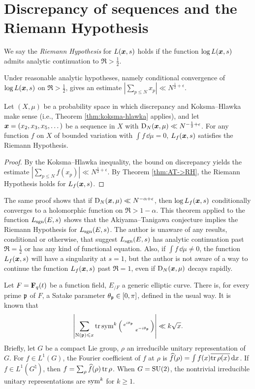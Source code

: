 \section{Discrepancy of sequences and the Riemann Hypothesis}

\begin{definition}
We say the \emph{Riemann Hypothesis} for $L({\boldsymbol x},s)$ holds if the function 
$\log L({\boldsymbol x},s)$ admits analytic continuation to $\Re > \frac 1 2$. 
\end{definition}

Under reasonable analytic hypotheses, namely conditional convergence of 
$\log L({\boldsymbol x},s)$ on $\Re > \frac 1 2$, \cite[II.1 Th.~10]{tenenbaum-1995} gives 
an estimate $|\sum_{p\leqslant N} x_p| \ll N^{\frac 1 2 + \epsilon}$. 

\begin{theorem}
Let $(X,\mu)$ be a probability space in which discrepancy and Koksma--Hlawka 
make sense (i.e., Theorem \ref{thm:koksma-hlawka} applies), and let 
${\boldsymbol x}=(x_2,x_3,x_5,\dots)$ be a sequence in $X$ with 
$\operatorname{D}_N({\boldsymbol x},\mu) \ll N^{-\frac 1 2+\epsilon}$. For any function $f$ on $X$ of 
bounded variation with $\int f\, \dd\mu = 0$, $L_f({\boldsymbol x},s)$ satisfies 
the Riemann Hypothesis. 
\end{theorem}
\begin{proof}
By the Koksma--Hlawka inequality, the bound on discrepancy yields the estimate 
$\left| \sum_{p\leqslant N} f(x_p)\right| \ll N^{\frac 1 2+\epsilon}$. 
By Theorem \ref{thm:AT->RH}, the Riemann Hypothesis holds for $L_f({\boldsymbol x},s)$. 
\end{proof}

The same proof shows that if $\operatorname{D}_N({\boldsymbol x},\mu)\ll N^{-\alpha+\epsilon}$, then 
$\log L_f({\boldsymbol x},s)$ conditionally converges to a holomorphic function on 
$\Re > 1 - \alpha$. This theorem applied to the function $L_{\operatorname{sgn}}(E,s)$ shows 
that the Akiyama--Tanigawa conjecture implies the Riemann Hypothesis for 
$L_{\operatorname{sgn}}(E,s)$. The author is unaware of any results, conditional or 
otherwise, that suggest $L_{\operatorname{sgn}}(E,s)$ has analytic continuation past 
$\Re = \frac 1 2$ or has any kind of functional equation. Also, if 
$\int f\, \dd\mu \ne 0$, the function $L_f({\boldsymbol x},s)$ will have a singularity at 
$s = 1$, but the author is not aware of a way to continue the function 
$L_f({\boldsymbol x},s)$ past $\Re = 1$, even if $\operatorname{D}_N({\boldsymbol x},\mu)$ decays rapidly. 

Let $F = \mathbf{F}_q(t)$ be a function field, $E_{/F}$ a generic elliptic curve. 
There is, for every prime $\mathfrak{p}$ of $F$, a Satake parameter 
$\theta_{\mathfrak{p}} \in [0,\pi]$, defined in the usual way. It is known 
\cite[Ch.~3]{katz-1988} that
\begin{equation}\label{eq:katz-char-bound}
	\left|\sum_{\operatorname{N}(\mathfrak{p}) \leqslant x} \operatorname{tr}\operatorname{sym}^k\left(\begin{smallmatrix} e^{i \theta_{\mathfrak{p}}} &  \\  & e^{- i \theta_{\mathfrak{p}}} \end{smallmatrix}\right) \right| \ll k \sqrt{x} .
\end{equation}
Briefly, let $G$ be a compact Lie group, $\rho$ an irreducible unitary 
representation of $G$. For $f\in L^1(G)$, the Fourier coefficient of $f$ at 
$\rho$ is $\widehat f(\rho) = \int f(x) \overline{\operatorname{tr}\rho(x)}\, \mathrm{d} x$. If 
$f\in L^1(G^\natural)$, then $f = \sum_\rho \widehat f(\rho) \operatorname{tr} \rho$. When 
$G = \operatorname{SU}(2)$, the nontrivial irreducible unitary representations are 
$\operatorname{sym}^k$ for $k\geqslant 1$. 

